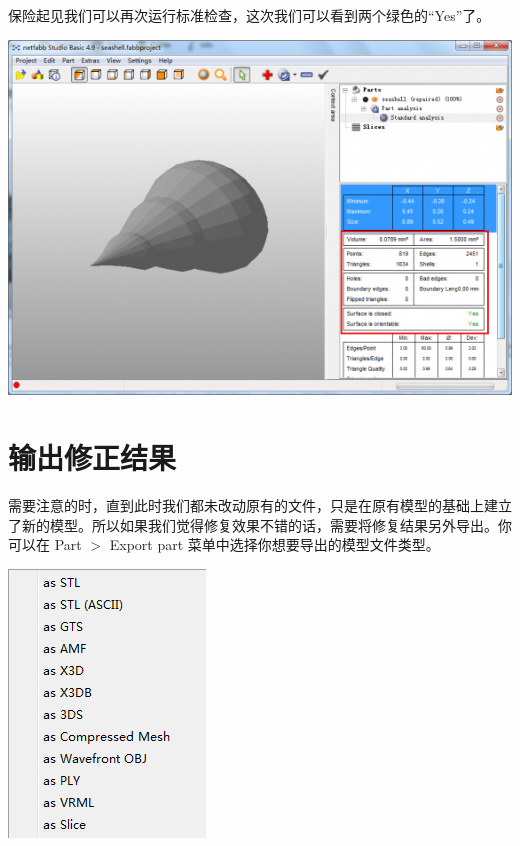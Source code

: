 \documentclass[10pt,a4paper]{article}
\begin{document}
\begin{CJK*}{UTF8}{song}
保险起见我们可以再次运行标准检查，这次我们可以看到两个绿色的“Yes”了。

\includegraphics[width=0.7\linewidth]{doubleCheck}

\section{输出修正结果}
需要注意的时，直到此时我们都未改动原有的文件，只是在原有模型的基础上建立了新的模型。所以如果我们觉得修复效果不错的话，需要将修复结果另外导出。你可以在 Part $ > $ Export part 菜单中选择你想要导出的模型文件类型。

\includegraphics[width=0.7\linewidth]{exportResult}


\end{CJK*}
\end{document}
